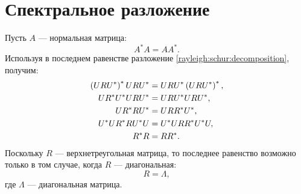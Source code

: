 \section{Спектральное разложение}

Пусть $A$ --- нормальная матрица:
\[
    A^* A = A A^* .
\]
Используя в последнем равенстве разложение \eqref{rayleigh:schur:decomposition}, получим:
\begin{align}
    \left ( U R U^* \right ) ^* U R U^* & = U R U^* \left ( U R U^* \right )^* , \notag \\
    U R^* U^* U R U^* & = U R U^* U R U^* , \notag \\
    U R^* R U^* & = U R R^* U^* , \notag \\
    U^* U R^* R U^* U & = U^* U R R^* U^* U, \notag \\
    R^* R & = R R^* \label{rayleigh:spectral:conjugation_equality}.
\end{align}
Поскольку $R$ --- верхнетреугольная матрица, то последнее равенство возможно только в том случае, когда $R$ --- диагональная:
\[
    R = \Lambda,
\]
где $\Lambda$ --- диагональная матрица.

